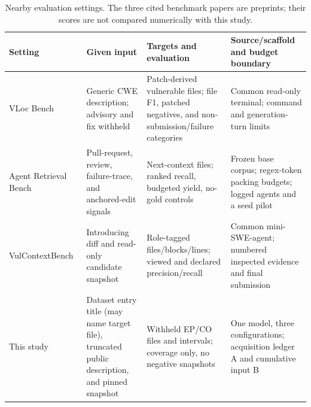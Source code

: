 \begin{table}[t]
\centering\small
\caption{Nearby evaluation settings. The three cited benchmark papers are preprints; their scores are not compared numerically with this study.}\label{tab:nearby}
\begin{tabular}{@{}>{\raggedright\arraybackslash}p{}>{\raggedright\arraybackslash}p{}>{\raggedright\arraybackslash}p{}>{\raggedright\arraybackslash}p{}@{}}
\toprule
Setting & Given input & Targets and evaluation & Source/scaffold and budget boundary \\
\midrule
VLoc Bench~\cite{vloc} & Generic CWE description; advisory and fix withheld & Patch-derived vulnerable files; file F1, patched negatives, and non-submission/failure categories & Common read-only terminal; command and generation-turn limits \\
Agent Retrieval Bench~\cite{agentretrieval} & Pull-request, review, failure-trace, and anchored-edit signals & Next-context files; ranked recall, budgeted yield, no-gold controls & Frozen base corpus; regex-token packing budgets; logged agents and a seed pilot \\
VulContextBench~\cite{vulcontext} & Introducing diff and read-only candidate snapshot & Role-tagged files/blocks/lines; viewed and declared precision/recall & Common mini-SWE-agent; numbered inspected evidence and final submission \\
This study & Dataset entry title (may name target file), truncated public description, and pinned snapshot & Withheld EP/CO files and intervals; coverage only, no negative snapshots & One model, three configurations; acquisition ledger A and cumulative input B \\
\bottomrule
\end{tabular}
\end{table}
